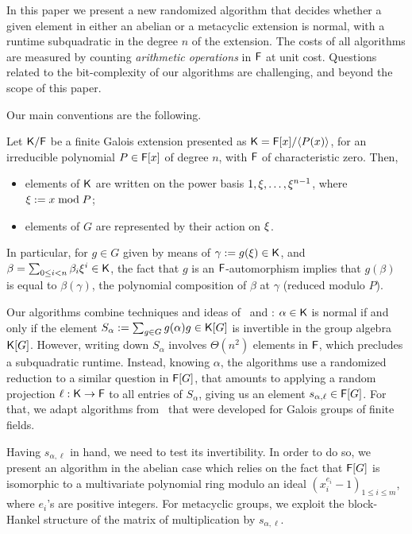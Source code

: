 In this paper we present a new randomized algorithm that decides
whether a given element in either an abelian or a metacyclic extension
is normal, with a runtime subquadratic in the degree $n$ of the
extension. The costs of all algorithms are measured by counting
\emph{arithmetic operations} in ${\mathsf{F}}$ at unit cost.  Questions related
to the bit-complexity of our algorithms are challenging, and beyond
the scope of this paper.

Our main conventions are the following.
\begin{assumption}
  \label{assum}
  Let ${\mathsf{K}}/{\mathsf{F}}$ be a finite Galois extension presented as
  ${\mathsf{K}}={\mathsf{F}}[x]/\langle P(x)\rangle$, for an irreducible polynomial $P\in
  {\mathsf{F}}[x]$ of degree $n$, with ${\mathsf{F}}$ of characteristic zero. Then,
  \begin{itemize}
  \item elements of ${\mathsf{K}}$ are written on the power basis $1,\xi,\dots,\xi^{n-1}$,
    where $\xi := x \bmod P$;
  \item elements of $G$ are represented by their action on $\xi$.
  \end{itemize}
\end{assumption}

In particular, for $g \in G$ given by means of $\gamma:=g(\xi) \in {\mathsf{K}}$,
and $\beta = \sum_{0\leq i<n}\beta_i\xi^i\in{\mathsf{K}}$, the fact that $g$ is an
${\mathsf{F}}$-automorphism implies that $g(\beta)$ is equal to $\beta(\gamma)$, the
polynomial composition of $\beta$ at $\gamma$ (reduced modulo $P$).

Our algorithms combine techniques and ideas of~\cite{GatGie90} and
\cite{KalSho98}: $\alpha \in {\mathsf{K}}$ is normal if and only if the element
$S_\alpha := \sum_{g \in G} g(\alpha)g \in {\mathsf{K}}[G]$ is invertible in the
group algebra ${\mathsf{K}}[G]$.  However, writing down $S_\alpha$ involves
$\Theta(n^2)$ elements in ${\mathsf{F}}$, which precludes a subquadratic
runtime. Instead, knowing $\alpha$, the algorithms use a randomized
reduction to a similar question in ${\mathsf{F}}[G]$, that amounts to applying a
random projection $\ell:{\mathsf{K}}\to{\mathsf{F}}$ to all entries of $S_\alpha$, giving
us an element $s_{\alpha,\ell} \in {\mathsf{F}}[G]$. For that, we adapt
algorithms from~\citep{KalSho98} that were developed for Galois groups
of finite fields.

Having $s_{\alpha,\ell}$ in hand, we need to test its
invertibility. In order to do so, we present an algorithm in the
abelian case which relies on the fact that ${\mathsf{F}}[G]$ is isomorphic to a
multivariate polynomial ring modulo an ideal $(x^{e_i}_i-1)_{1 \leq i
  \leq m}$, where $e_i$'s are positive integers. For metacyclic
groups, we exploit the block-Hankel structure of the matrix of
multiplication by $s_{\alpha,\ell}$. 

